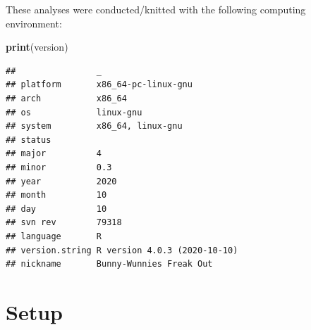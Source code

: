 \documentclass[]{book}
\newenvironment{Shaded}{\begin{snugshade}}{\end{snugshade}}
\newcommand{\KeywordTok}[1]{\textcolor[rgb]{0.13,0.29,0.53}{\textbf{#1}}}
\newcommand{\NormalTok}[1]{#1}
\begin{document}
These analyses were conducted/knitted with the following computing environment:

\begin{Shaded}
\begin{Highlighting}[]
\KeywordTok{print}\NormalTok{(version)}
\end{Highlighting}
\end{Shaded}

\begin{verbatim}
##                _                           
## platform       x86_64-pc-linux-gnu         
## arch           x86_64                      
## os             linux-gnu                   
## system         x86_64, linux-gnu           
## status                                     
## major          4                           
## minor          0.3                         
## year           2020                        
## month          10                          
## day            10                          
## svn rev        79318                       
## language       R                           
## version.string R version 4.0.3 (2020-10-10)
## nickname       Bunny-Wunnies Freak Out
\end{verbatim}

\hypertarget{setup-1}{%
\section{Setup}\label{setup-1}}
\end{document}

